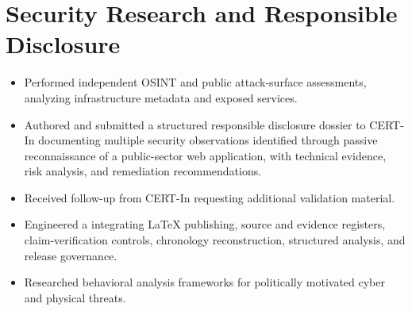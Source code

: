 \section{Security Research and Responsible Disclosure}
\begin{itemize}
  \item Performed independent OSINT and public attack-surface assessments, analyzing infrastructure metadata and exposed services.
  \item Authored and submitted a structured responsible disclosure dossier to CERT-In documenting multiple security observations identified through passive reconnaissance of a public-sector web application, with technical evidence, risk analysis, and remediation recommendations.
  \item Received follow-up from CERT-In requesting additional validation material.
  \item Engineered a  integrating LaTeX publishing, source and evidence registers, claim-verification controls, chronology reconstruction, structured analysis, and release governance.
  \item Researched behavioral analysis frameworks for politically motivated cyber and physical threats.
\end{itemize}
